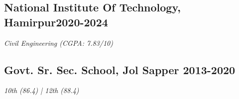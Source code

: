 \vspace*{10pt}
\subsection {{National Institute Of Technology, Hamirpur}\hfill 2020-2024}
\vspace*{3pt}
\textit{Civil Engineering (CGPA: 7.83/10)}

\vspace*{6pt}
\subsection{{Govt. Sr. Sec. School, Jol Sapper }\hfill 2013-2020}
\vspace*{3pt}
\textit{10th (86.4) | 12th (88.4)}
